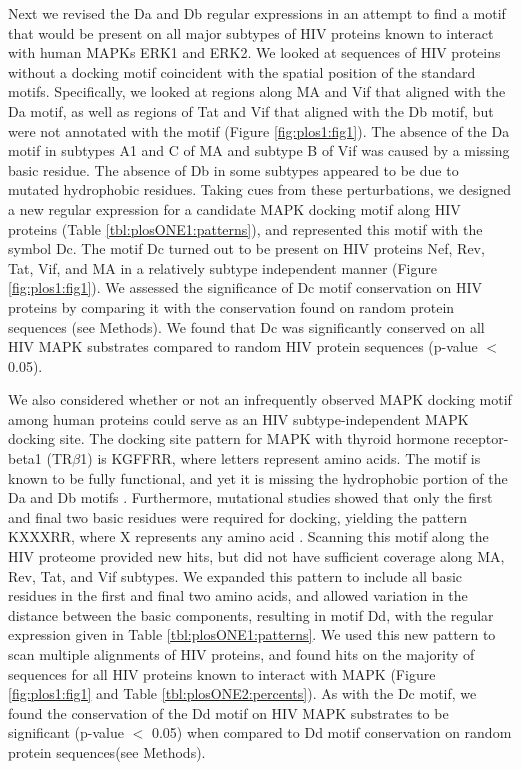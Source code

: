 Next we revised the Da and Db regular expressions in an attempt to
find a motif that would be present on all major subtypes of HIV
proteins known to interact with human MAPKs ERK1 and ERK2. We looked
at sequences of HIV proteins without a docking motif coincident with
the spatial position of the standard motifs. Specifically, we looked
at regions along MA and Vif that aligned with the Da motif, as well as
regions of Tat and Vif that aligned with the Db motif, but were not
annotated with the motif (Figure \ref{fig:plos1:fig1}). The absence of
the Da motif in subtypes A1 and C of MA and subtype B of Vif was
caused by a missing basic residue. The absence of Db in some subtypes
appeared to be due to mutated hydrophobic residues. Taking cues from
these perturbations, we designed a new regular expression for a
candidate MAPK docking motif along HIV proteins (Table
\ref{tbl:plosONE1:patterns}), and represented this motif with the
symbol Dc. The motif Dc turned out to be present on HIV proteins Nef,
Rev, Tat, Vif, and MA in a relatively subtype independent manner
(Figure \ref{fig:plos1:fig1}). We assessed the significance of Dc
motif conservation on HIV proteins by comparing it with the
conservation found on random protein sequences (see Methods). We found
that Dc was significantly conserved on all HIV MAPK substrates
compared to random HIV protein sequences (p-value $<$ 0.05).

We also considered whether or not an infrequently observed MAPK
docking motif among human proteins could serve as an HIV
subtype-independent MAPK docking site. The docking site pattern for
MAPK with thyroid hormone receptor-beta1 (TR$\beta$1) is KGFFRR, where
letters represent amino acids. The motif is known to be fully
functional, and yet it is missing the hydrophobic portion of the Da
and Db motifs \cite{lin03}. Furthermore, mutational studies showed
that only the first and final two basic residues were required for
docking, yielding the pattern KXXXRR, where X represents any amino
acid \cite{lin03}. Scanning this motif along the HIV proteome provided
new hits, but did not have sufficient coverage along MA, Rev, Tat, and
Vif subtypes. We expanded this pattern to include all basic residues
in the first and final two amino acids, and allowed variation in the
distance between the basic components, resulting in motif Dd, with the
regular expression given in Table \ref{tbl:plosONE1:patterns}. We used
this new pattern to scan multiple alignments of HIV proteins, and
found hits on the majority of sequences for all HIV proteins known to
interact with MAPK (Figure \ref{fig:plos1:fig1} and Table
\ref{tbl:plosONE2:percents}). As with the Dc motif, we found the
conservation of the Dd motif on HIV MAPK substrates to be significant
(p-value $<$ 0.05) when compared to Dd motif conservation on random
protein sequences(see Methods).

